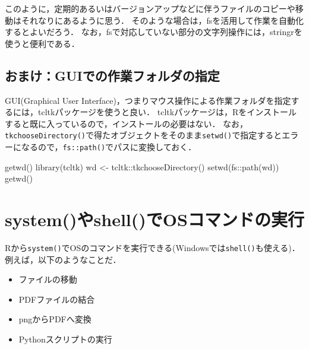 \documentclass[
]{article}
\newenvironment{Shaded}{\begin{snugshade}}{\end{snugshade}}
\newcommand{\FunctionTok}[1]{\textcolor[rgb]{0.00,0.00,0.00}{#1}}
\newcommand{\NormalTok}[1]{#1}
\newcommand{\OtherTok}[1]{\textcolor[rgb]{0.56,0.35,0.01}{#1}}
\newcommand{\SpecialCharTok}[1]{\textcolor[rgb]{0.00,0.00,0.00}{#1}}
\providecommand{\tightlist}{%
  \setlength{\itemsep}{0pt}\setlength{\parskip}{0pt}}
\begin{document}
このように，定期的あるいはバージョンアップなどに伴うファイルのコピーや移動はそれなりにあるように思う．
そのような場合は，fsを活用して作業を自動化するとよいだろう．
なお，fsで対応していない部分の文字列操作には，stringrを使うと便利である．

\hypertarget{ux304aux307eux3051guiux3067ux306eux4f5cux696dux30d5ux30a9ux30ebux30c0ux306eux6307ux5b9a}{%
\subsection{おまけ：GUIでの作業フォルダの指定}\label{ux304aux307eux3051guiux3067ux306eux4f5cux696dux30d5ux30a9ux30ebux30c0ux306eux6307ux5b9a}}

GUI(Graphical User Interface)，つまりマウス操作による作業フォルダを指定するには，tcltkパッケージを使うと良い．
tcltkパッケージは，Rをインストールすると既に入っているので，インストールの必要はない．
なお，\texttt{tkchooseDirectory()}で得たオブジェクトをそのまま\texttt{setwd()}で指定するとエラーになるので，\texttt{fs::path()}でパスに変換しておく．

\begin{Shaded}
\begin{Highlighting}[]
\FunctionTok{getwd}\NormalTok{()}
\FunctionTok{library}\NormalTok{(tcltk)}
\NormalTok{wd }\OtherTok{\textless{}{-}}\NormalTok{ tcltk}\SpecialCharTok{::}\FunctionTok{tkchooseDirectory}\NormalTok{()}
\FunctionTok{setwd}\NormalTok{(fs}\SpecialCharTok{::}\FunctionTok{path}\NormalTok{(wd))}
\FunctionTok{getwd}\NormalTok{()}
\end{Highlighting}
\end{Shaded}

\hypertarget{shell}{%
\section{system()やshell()でOSコマンドの実行}\label{shell}}

Rから\texttt{system()}でOSのコマンドを実行できる(Windowsでは\texttt{shell()}も使える)．
例えば，以下のようなことだ．

\begin{itemize}
\tightlist
\item
  ファイルの移動\\
\item
  PDFファイルの結合\\
\item
  pngからPDFへ変換\\
\item
  Pythonスクリプトの実行
\end{itemize}
\end{document}
